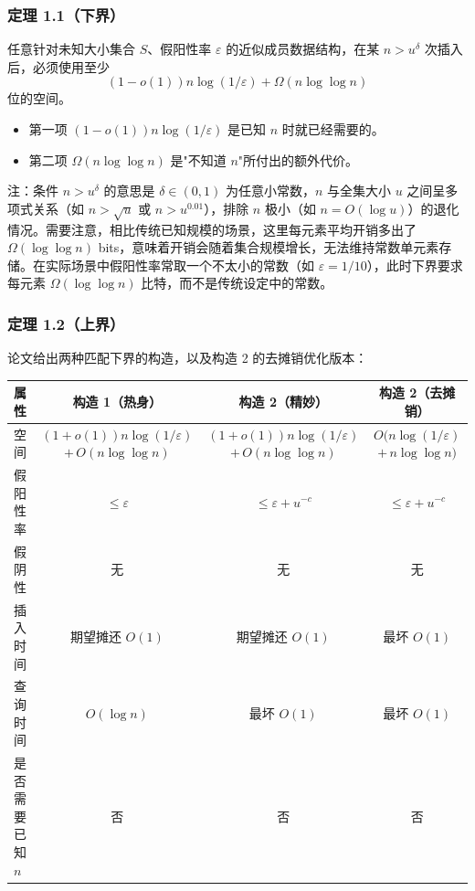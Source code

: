 \documentclass[UTF8,11pt,a4paper]{ctexart}
\begin{document}
\subsubsection{定理 1.1（下界）}

任意针对未知大小集合 $S$、假阳性率 $\varepsilon$ 的近似成员数据结构，在某 $n > u^\delta$ 次插入后，必须使用至少
\[
(1-o(1))n\log(1/\varepsilon) + \Omega(n\log\log n)
\]
位的空间。
\begin{itemize}
    \item 第一项 $(1-o(1))n\log(1/\varepsilon)$ 是已知 $n$ 时就已经需要的。
    \item 第二项 $\Omega(n\log\log n)$ 是"不知道 $n$"所付出的额外代价。
\end{itemize}

注：条件 $n > u^\delta$ 的意思是 $\delta \in (0,1)$ 为任意小常数，$n$ 与全集大小 $u$ 之间呈多项式关系（如 $n > \sqrt{u}$ 或 $n > u^{0.01}$），排除 $n$ 极小（如 $n = O(\log u)$）的退化情况。需要注意，相比传统已知规模的场景，这里每元素平均开销多出了 $\Omega(\log\log n)$ bits，意味着开销会随着集合规模增长，无法维持常数单元素存储。在实际场景中假阳性率常取一个不太小的常数（如 $\varepsilon = 1/10$），此时下界要求每元素 $\Omega(\log\log n)$ 比特，而不是传统设定中的常数。

\subsubsection{定理 1.2（上界）}

论文给出两种匹配下界的构造，以及构造 2 的去摊销优化版本：

\begin{center}
\footnotesize
\renewcommand{\arraystretch}{1.25}
\setlength{\tabcolsep}{4pt}
\begin{tabular}{|l|c|c|c|}
\hline
\textbf{属性} & \textbf{构造 1（热身）} & \textbf{构造 2（精妙）} & \textbf{构造 2（去摊销）} \\
\hline
空间 & 
$(1+o(1))n\log(1/\varepsilon)$ 
\newline $+\,O(n\log\log n)$ 
& 
$(1+o(1))n\log(1/\varepsilon)$ 
\newline $+\,O(n\log\log n)$ 
& 
$O\bigl(n\log(1/\varepsilon)$ 
\newline $+\,n\log\log n\bigr)$ \\
\hline
假阳性率 & $\le\varepsilon$ & $\le\varepsilon+u^{-c}$ & $\le\varepsilon+u^{-c}$ \\
\hline
假阴性 & 无 & 无 & 无 \\
\hline
插入时间 & 期望摊还 $O(1)$ & 期望摊还 $O(1)$ & 最坏 $O(1)$ \\
\hline
查询时间 & $O(\log n)$ & 最坏 $O(1)$ & 最坏 $O(1)$ \\
\hline
是否需要已知 $n$ & 否 & 否 & 否 \\
\hline
\end{tabular}
\end{center}
\end{document}
